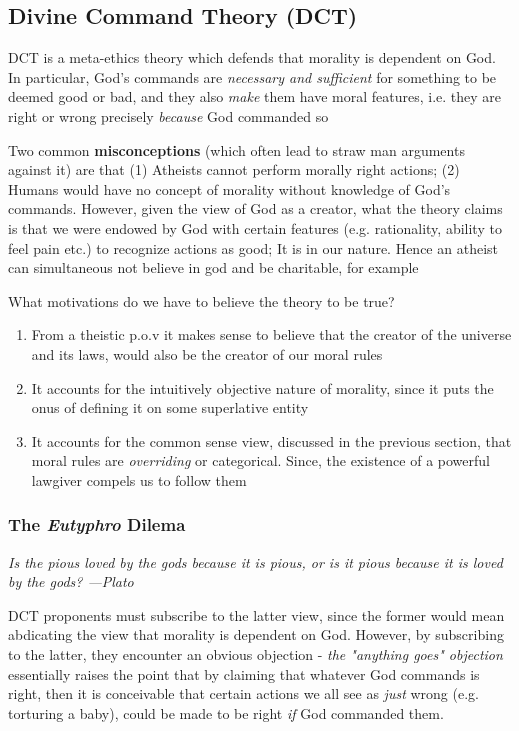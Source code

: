 \documentclass[english,course]{Notes}
\newcommand{\ita}[1]{\textit{#1}}
\newcommand\quo[1]{\begin{displayquote}\ita{\large{#1}}\end{displayquote}}
\begin{document}
{{\subsection{Divine Command Theory (DCT)}

\par{DCT is a meta-ethics theory which defends that morality is dependent on God. In particular, God's commands are \ita{necessary and sufficient} for something to be deemed good or bad, and they also \ita{make} them have moral features, i.e. they are right or wrong precisely \ita{because} God commanded so}

\par{Two common \textbf{misconceptions} (which often lead to straw man arguments against it) are that (1) Atheists cannot perform morally right actions; (2) Humans would have no concept of morality without knowledge of God's commands. However, given the view of God as a creator, what the theory claims is that we were endowed by God with certain features (e.g. rationality, ability to feel pain etc.) to recognize actions as good; It is in our nature. Hence an atheist can simultaneous not believe in god and be charitable, for example \\}

\par{What motivations do we have to believe the theory to be true?}
\begin{enumerate}
	\item{From a theistic p.o.v it makes sense to believe that the creator of the universe and its laws, would also be the creator of our moral rules}
	\item{It accounts for the intuitively objective nature of morality, since it puts the onus of defining it on some superlative entity}
	\item{It accounts for the common sense view, discussed in the previous section, that moral rules are \ita{overriding} or categorical. Since, the existence of a powerful lawgiver compels us to follow them}
\end{enumerate}

\subsubsection{The \ita{Eutyphro} Dilema}

\quo{Is the pious loved by the gods because it is pious, or is it pious because it is loved by the gods? ---Plato}

\par{DCT proponents must subscribe to the latter view, since the former would mean abdicating the view that morality is dependent on God. However, by subscribing to the latter, they encounter an obvious objection - \ita{the "anything goes" objection} essentially raises the point that by claiming that whatever God commands is right, then it is conceivable that certain actions we all see as \ita{just} wrong (e.g. torturing a baby), could be made to be right \ita{if} God commanded them.}

}}
\end{document}
